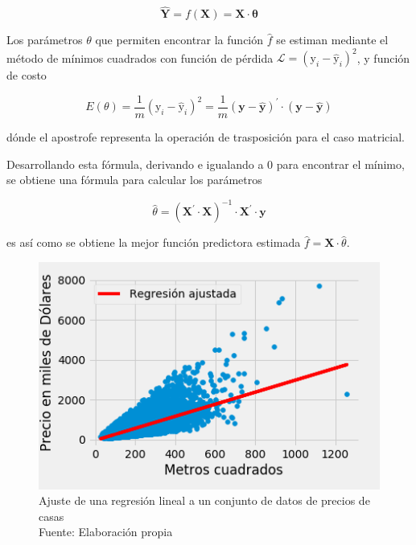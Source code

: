         \begin{equation}
            \mathbf{\hat{Y}} = f(\mathbf{X}) = \mathbf{X}\cdot\mathbf{\theta}
        \end{equation}
        
        Los parámetros $\theta$ que permiten encontrar la función $\hat{f}$ se estiman mediante el método de mínimos cuadrados con función de pérdida $\mathcal{L} =  (\mathrm{y}_i - \mathrm{\hat{y}}_i)^2$, y función de costo
        
        \begin{equation}
            E(\theta) = \frac{1}{m} (\mathrm{y}_i - \mathrm{\hat{y}}_i)^2 = \frac{1}{m} (\mathbf{y} - \mathbf{\hat{y}})^\prime\cdot (\mathbf{y} - \mathbf{\hat{y}})
        \end{equation}
        
        \noindent dónde el apostrofe representa la operación de trasposición para el caso matricial.
        
        Desarrollando esta fórmula, derivando e igualando a 0 para encontrar el mínimo, se obtiene una fórmula para calcular los parámetros
        
        \begin{equation}
            \hat{\theta} = (\mathbf{X}^\prime\cdot\mathbf{X})^{-1}\cdot\mathbf{X}^\prime\cdot\mathbf{y}
        \end{equation}
        
        \noindent es así como se obtiene la mejor función predictora estimada $\hat{f} = \mathbf{X}\cdot\hat{\theta}$.
        
        \begin{figure}[H]
            \centering
            \includegraphics[scale=0.45]{imagenes/linear_fit}
            \caption[Ajuste de regresión lineal]{Ajuste de una regresión lineal a un conjunto de datos de precios de casas\\ Fuente: Elaboración propia}
        \end{figure}
    	
